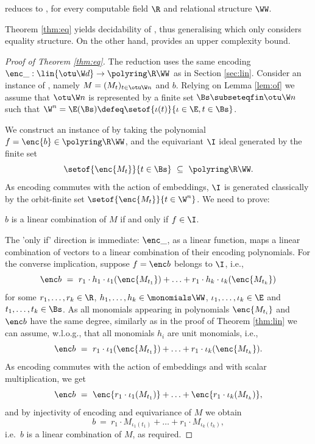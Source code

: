 %
%
\begin{theorem} \label{thm:eq}
reduces to
, 
for every computable field $\R$ and relational structure $\WW$.
\end{theorem}
%
Theorem \ref{thm:eq} yields decidability of , 
thus generalising \cite[Theorem 4.4]{GHL22} which only considers
equality structure. %
On the other hand, \cite{GHL22} provides an upper complexity bound.
%
\begin{proof}[Proof of Theorem \ref{thm:eq}]
The reduction uses the same encoding $\enc \_ : \lin{\otu \W d} \to \polyring \R \WW$ as in 
Section \ref{sec:lin}.
Consider an instance of , namely 
$M = (M_t)_{t\in\otu \W n}$ and $b$.
Relying on Lemma \ref{lem:of} we assume that 
$\otu \W n$ is represented by a finite set $\Bs\subseteqfin \otu \W n$ such that
$\W^n = \E(\Bs) \defeq \setof{\iota(t)}{\iota\in\E, t\in\Bs}$.

%
We construct an instance of  by
taking the polynomial $f = \enc{b}\in\polyring \R \WW$, and the equivariant $\I$ ideal generated
by the finite set
\[
\setof{\enc {M_t}}{t\in\Bs} \ \subseteq \ \polyring \R \WW.
\]
As encoding commutes with the action of embeddings,
$\I$ is generated classically by the orbit-finite set
$\setof{\enc {M_t}}{t\in\W^n}$.
We need to prove:
%
\begin{claim} \label{claim:enc-corr}
$b$ is a linear combination of $M$ if and only if $f\in \I$.
\end{claim}
The 'only if' direction is immediate: $\enc \_$, as a linear function, maps a linear combination
of vectors to a linear combination of their encoding polynomials. 
For the converse implication, suppose 
$f = \enc b$ belongs to $\I$, i.e.,
\[
\enc b  \ = \  r_1 \cdot h_1 \cdot \iota_1(\enc{M_{t_1}})  +  \ldots  + 
  r_1 \cdot h_k \cdot \iota_k(\enc{M_{t_k}}) 
\]
for some $r_1, \ldots, r_k\in\R$, $h_1, \ldots, h_k \in \monomials \WW$,
$\iota_1, \ldots, \iota_k \in \E$ and $t_1, \ldots, t_k\in \Bs$.
As all monomials appearing in polynomials $\enc{M_{t_i}}$ and $\enc b$ have the same degree,
similarly as in the proof of Theorem \ref{thm:lin}  we can assume, w.l.o.g., 
that all monomials
$h_i$ are unit monomials, i.e.,
\[
\enc b  \ = \  r_1 \cdot \iota_1(\enc{M_{t_1}})  +  \ldots  +  r_1 \cdot \iota_k(\enc{M_{t_k}}).
\]
As encoding commutes with the action of embeddings and with scalar multiplication, we get
\[
\enc b  \ = \  \enc{r_1 \cdot \iota_1(M_{t_1})}  +  \ldots  +  \enc{r_1 \cdot \iota_k(M_{t_k})},
\]
and by injectivity of encoding and equivariance of $M$ we obtain 
\[
 b  \ = \  r_1 \cdot M_{\iota_1(t_1)}  +  \ldots  +  r_1 \cdot M_{\iota_k(t_k)},
\]
i.e.~$b$ is a linear combination of $M$, as required.
\end{proof}


